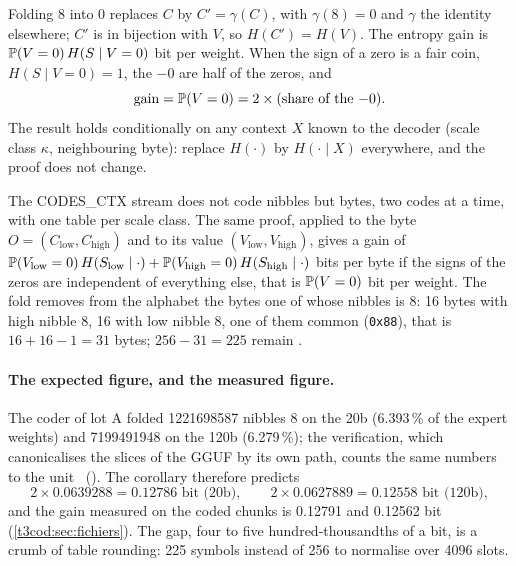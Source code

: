 \begin{corollaire}\label{t3cod:cor:gain}
Folding 8 into 0 replaces $C$ by $C' = \gamma(C)$, with $\gamma(8) = 0$ and $\gamma$ the identity elsewhere; $C'$ is in bijection with $V$, so $H(C') = H(V)$. The entropy gain is $\mathbb{P}(V = 0)\,H(S \mid V = 0)$ bit per weight. When the sign of a zero is a fair coin, $H(S \mid V = 0) = 1$, the $-0$ are half of the zeros, and
\begin{equation}\label{t3cod:eq:deux-fois}
\text{gain} = \mathbb{P}(V = 0) = 2 \times \text{(share of the } {-0}\text{)}.
\end{equation}
The result holds conditionally on any context $X$ known to the decoder (scale class $\kappa$, neighbouring byte): replace $H(\cdot)$ by $H(\cdot \mid X)$ everywhere, and the proof does not change.
\end{corollaire}

\begin{remarque}\label{t3cod:rem:octet}
The CODES\_CTX stream does not code nibbles but bytes, two codes at a time, with one table per scale class. The same proof, applied to the byte $O = (C_{\text{low}}, C_{\text{high}})$ and to its value $(V_{\text{low}}, V_{\text{high}})$, gives a gain of $\mathbb{P}(V_{\text{low}} = 0)\,H(S_{\text{low}} \mid \cdot) + \mathbb{P}(V_{\text{high}} = 0)\,H(S_{\text{high}} \mid \cdot)$ bits per byte if the signs of the zeros are independent of everything else, that is $\mathbb{P}(V = 0)$ bit per weight. The fold removes from the alphabet the bytes one of whose nibbles is 8: 16 bytes with high nibble 8, 16 with low nibble 8, one of them common (\texttt{0x88}), that is $16 + 16 - 1 = 31$ bytes; $256 - 31 = 225$ remain \calc.
\end{remarque}

\paragraph{The expected figure, and the measured figure.} The coder of lot A folded \num{1221698587} nibbles 8 on the 20b (6.393\,\% of the expert weights) and \num{7199491948} on the 120b (6.279\,\%); the verification, which canonicalises the slices of the GGUF by its own path, counts the same numbers to the unit \mes~(). The corollary therefore predicts \calc
\[
2 \times 0.0639288 = 0.12786 \text{ bit (20b)}, \qquad 2 \times 0.0627889 = 0.12558 \text{ bit (120b)},
\]
and the gain measured on the coded chunks is 0.12791 and 0.12562 bit (\cref{t3cod:sec:fichiers}). The gap, four to five hundred-thousandths of a bit, is a crumb of table rounding: 225 symbols instead of 256 to normalise over \num{4096} slots.

